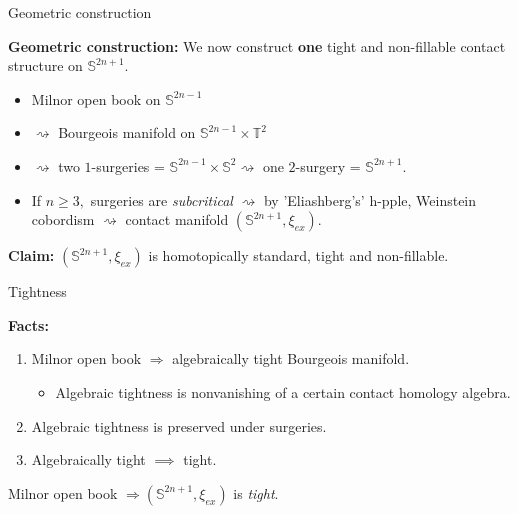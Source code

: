 \documentclass{beamer}
\begin{document}
\begin{frame}{Geometric construction}
    
    \textbf{Geometric construction:} We now construct \textbf{one} tight and non-fillable contact structure on $\mathbb S^{2n+1}$.
    
    \medskip
    
    \pause

    \begin{itemize}
    \item Milnor open book on $\mathbb S^{2n-1}$
    \medskip \pause
    \item $\rightsquigarrow$ Bourgeois manifold on $\mathbb S^{2n-1}\times \mathbb T^2$
    \medskip \pause
    \item $\rightsquigarrow $ two $1$-surgeries = $\mathbb S^{2n-1}\times \mathbb S^2 \rightsquigarrow$ one $2$-surgery = $\mathbb S^{2n+1}.$ 
    \medskip \pause   
    \item If $n\geq 3,$ surgeries are \emph{subcritical} $\rightsquigarrow$ by 'Eliashberg's' h-pple, 
    Weinstein cobordism $\rightsquigarrow$ contact manifold $(\mathbb S^{2n+1},\xi_{ex})$.
    \end{itemize}

    \pause
    
    \medskip

    \begin{tcolorbox}
    \textbf{Claim:} $(\mathbb S^{2n+1},\xi_{ex})$ is homotopically standard, tight and non-fillable.
    \end{tcolorbox}
    
\end{frame}

\begin{frame}{Tightness}

    \textbf{Facts:} \begin{enumerate}
        \item Milnor open book $\Rightarrow$  algebraically tight Bourgeois manifold.
        \pause
        \begin{itemize}
            \item Algebraic tightness is nonvanishing of a certain contact homology algebra.
        \end{itemize}
        \pause
        \item Algebraic tightness is preserved under surgeries.
        \pause
        \item Algebraically tight $\implies$ tight.
    \end{enumerate}
    
    \pause
    
    \vspace*{1cm}
    
    \begin{tcolorbox}
        Milnor open book $\Rightarrow (\mathbb S^{2n+1},\xi_{ex})$ is \emph{tight}.
    \end{tcolorbox}
    
\end{frame}
\end{document}
